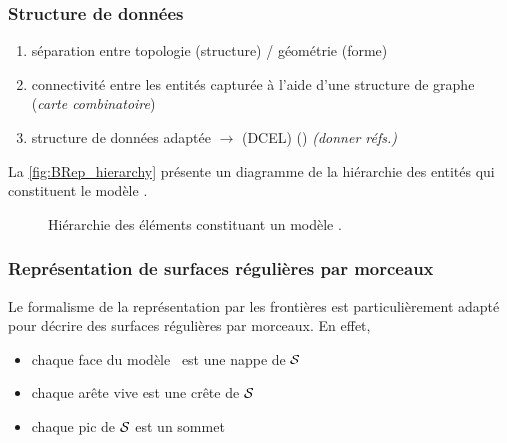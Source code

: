 \subsubsection{Structure de données}
\begin{enumerate}
	\item séparation entre topologie (structure) / géométrie (forme)
	\item connectivité entre les entités capturée à l'aide d'une structure de graphe (\textit{carte combinatoire})%
	\item structure de données adaptée $\to$  (DCEL) () \textit{(donner réfs.)}
\end{enumerate}

La \autoref{fig:BRep_hierarchy} présente un diagramme de la hiérarchie des entités qui constituent le modèle \brep.
\begin{figure}
	\centering
	
	\caption{Hiérarchie des éléments constituant un modèle \brep.}
	\label{fig:BRep_hierarchy}
\end{figure}


\subsubsection{Représentation de surfaces régulières par morceaux}
Le formalisme de la représentation par les frontières est particulièrement adapté pour décrire des surfaces régulières par morceaux. 
En effet, 
\begin{itemize}
	\item chaque face du modèle \brep\ est une nappe de $\mathcal{S}$
	\item chaque arête vive est une crête de $\mathcal{S}$
	\item chaque pic de $\mathcal{S}$ est un sommet \brep
\end{itemize}












